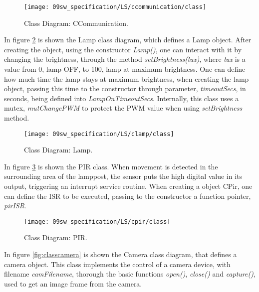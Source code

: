 \begin{figure}[H]
	\centering
	\texttt{[image: 09sw\_specification/LS/ccommunication/class]}
	\caption{Class Diagram: CCommunication.}
	\label{fig:CCommunicationClass}
\end{figure}

\clearpage
{}

In figure \ref{fig:classlamp} is shown the Lamp class diagram, which defines a Lamp object. After creating the object, using the constructor \textit{Lamp()}, one can interact with it by changing the brightness, through the method \textit{setBrightness(lux)}, where \textit{lux} is a value from 0, lamp OFF, to 100, lamp at maximum brightness. One can define how much time the lamp stays at maximum brightness, when creating the lamp object, passing this time to the constructor through parameter, \textit{timeoutSecs}, in seconds, being defined into \textit{LampOnTimeoutSecs}. Internally, this class uses a mutex, \textit{mutChangePWM} to protect the PWM value when using \textit{setBrightness} method. 

\begin{figure}[H]
	\centering
	\texttt{[image: 09sw\_specification/LS/clamp/class]}
	\caption{Class Diagram: Lamp.}
	\label{fig:classlamp}
\end{figure}

\clearpage
{}

In figure \ref{fig:classpir} is shown the PIR class. When movement is detected in the surrounding area of the lamppost, the sensor puts the high digital value in its output, triggering an interrupt service routine. When creating a object CPir, one can define the ISR to be executed, passing to the constructor a function pointer, \textit{pirISR}.

\begin{figure}[H]
	\centering
	\texttt{[image: 09sw\_specification/LS/cpir/class]}
	\caption{Class Diagram: PIR.}
	\label{fig:classpir}
\end{figure}


In figure \ref{fig:classcamera} is shown the Camera class diagram, that defines a camera object.  This class implements the control of a camera device, with filename \textit{camFilename}, thorough the basic functions \textit{open()}, \textit{close()} and \textit{capture()}, used to get an image frame from the camera.

